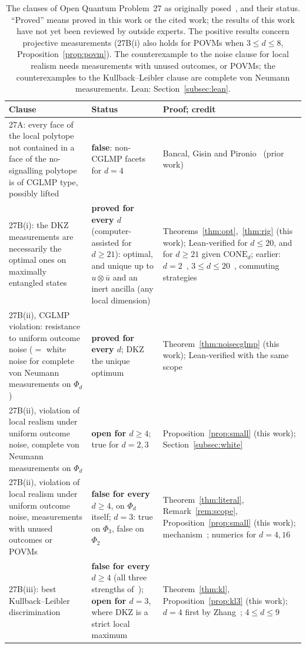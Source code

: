 \documentclass[11pt]{article}
\theoremstyle{remark}
\numberwithin{equation}{section}
\newcommand{\CONE}{\mathrm{CONE}}
\begin{document}
\begin{table}[t]
\centering\small
\caption{The clauses of Open Quantum Problem~27 as originally posed~\cite{OQP}, and their status. ``Proved'' means proved
in this work or the cited work; the results of this work have not yet been reviewed by outside experts. The positive
results concern projective measurements (27B(i) also holds for POVMs when $3\le d\le8$, Proposition~\ref{prop:povm}).
The counterexample to the noise clause for local realism needs measurements with unused outcomes, or POVMs; the
counterexamples to the Kullback--Leibler clause are complete von Neumann measurements. Lean:
Section~\ref{subsec:lean}.}
\label{tab:status}
\begin{tabular}{@{}>{\raggedright\arraybackslash}p{}>{\raggedright\arraybackslash}p{}>{\raggedright\arraybackslash}p{}@{}}
\toprule
Clause & Status & Proof; credit\\
\midrule
27A: every face of the local polytope not contained in a face of the no-signalling polytope is of CGLMP type,
possibly lifted & \textbf{false}: non-CGLMP facets for $d=4$ & Bancal, Gisin and Pironio~\cite{BGP} (prior work)\\
27B(i): the DKZ measurements are necessarily the optimal ones on maximally entangled states & \textbf{proved for every
$d$} (computer-assisted for $d\ge21$): optimal, and unique up to $u\otimes\bar u$ and an inert ancilla (any local
dimension) &
Theorems~\ref{thm:opt},~\ref{thm:rig} (this work); Lean-verified for $d\le20$, and for $d\ge21$ given $\CONE_d$;
earlier: $d=2$~\cite{Tsirelson}, $3\le d\le20$~\cite{repoCGLMP}, commuting strategies~\cite{MSclassical}\\
27B(ii), CGLMP violation: resistance to uniform outcome noise ($=$ white noise for complete von Neumann measurements
on $\Phi_d$) & \textbf{proved for every $d$}; DKZ the unique optimum & Theorem~\ref{thm:noisecglmp} (this work); Lean-verified
with the same scope\\
27B(ii), violation of local realism under uniform outcome noise, complete von Neumann measurements on $\Phi_d$ &
\textbf{open for $d\ge4$}; true for $d=2,3$ & Proposition~\ref{prop:small} (this work); Section~\ref{subsec:white}\\
27B(ii), violation of local realism under uniform outcome noise, measurements with unused outcomes or POVMs &
\textbf{false for every $d\ge4$}, on $\Phi_d$ itself; $d=3$: true on $\Phi_3$, false on $\Phi_2$ &
Theorem~\ref{thm:literal}, Remark~\ref{rem:scope}, Proposition~\ref{prop:small} (this work);
mechanism~\cite[eq.~(14)]{ADGL}; numerics for $d=4,16$~\cite{BRL}\\
27B(iii): best Kullback--Leibler discrimination & \textbf{false for every $d\ge4$} (all three strengths
of~\cite{vDGG}); \textbf{open for $d=3$}, where DKZ is a strict local maximum & Theorem~\ref{thm:kl},
Proposition~\ref{prop:kl3} (this work); $d=4$ first by Zhang~\cite{Zhang}; $4\le d\le9$~\cite{repoCGLMP}\\
\bottomrule
\end{tabular}
\end{table}
\end{document}
